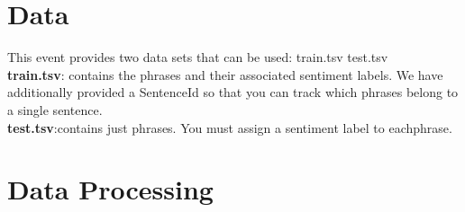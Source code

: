 \section{Data} \label{sec-preliminaries}

This event provides two data sets that can be used: train.tsv  test.tsv\\
\textbf{train.tsv}: contains the phrases and their associated sentiment labels.
    We have additionally provided a SentenceId so that you can track which
    phrases belong to a single sentence.\\
\textbf{test.tsv}:contains just phrases. You must assign a sentiment label to eachphrase.



\section{Data Processing} \label{sec-method}
